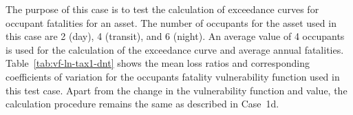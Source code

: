 The purpose of this case is to test the calculation of exceedance curves for occupant fatalities for an asset. The number of occupants for the asset used in this case are 2 (day), 4 (transit), and 6 (night). An average value of 4 occupants is used for the calculation of the exceedance curve and average annual fatalities. Table~\ref{tab:vf-ln-tax1-dnt} shows the mean loss ratios and corresponding coefficients of variation for the occupants fatality vulnerability function used in this test case. Apart from the change in the vulnerability function and value, the calculation procedure remains the same as described in Case~1d.


